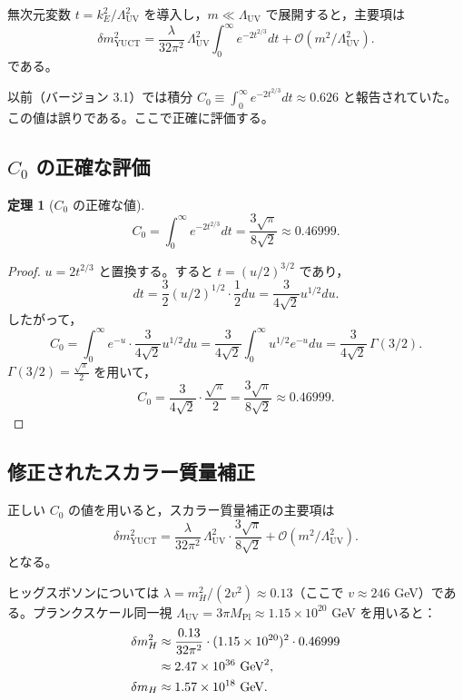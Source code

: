 \documentclass[11pt,a4paper]{article}
\newcommand{\Mpl}{M_{\mathrm{Pl}}}
\newcommand{\LUV}{\Lambda_{\mathrm{UV}}}
\newtheorem{theorem}{定理}[section]
\theoremstyle{remark}
\begin{document}
	無次元変数 \(t = k_E^2/\LUV^2\) を導入し，\(m \ll \LUV\) で展開すると，主要項は
	\begin{equation}
		\delta m^2_{\mathrm{YUCT}} = \frac{\lambda}{32\pi^2}\,\LUV^2 \int_0^{\infty} e^{-2t^{2/3}} dt + \mathcal{O}(m^2/\LUV^2).
		\label{eq:scalar_lead}
	\end{equation}
	である。
	
	以前（バージョン 3.1）では積分 \(C_0 \equiv \int_0^{\infty} e^{-2t^{2/3}} dt \approx 0.626\) と報告されていた。この値は誤りである。ここで正確に評価する。
	
	\subsection{\(C_0\) の正確な評価}
	
	\begin{theorem}[\(C_0\) の正確な値]
		\label{thm:C0}
		\[
		C_0 = \int_0^{\infty} e^{-2t^{2/3}} dt = \frac{3\sqrt{\pi}}{8\sqrt{2}} \approx 0.46999.
		\]
	\end{theorem}
	
	\begin{proof}
		\(u = 2t^{2/3}\) と置換する。すると \(t = (u/2)^{3/2}\) であり，
		\[
		dt = \frac{3}{2} (u/2)^{1/2} \cdot \frac{1}{2} du = \frac{3}{4\sqrt{2}} u^{1/2} du.
		\]
		したがって，
		\[
		C_0 = \int_0^{\infty} e^{-u} \cdot \frac{3}{4\sqrt{2}} u^{1/2} du = \frac{3}{4\sqrt{2}} \int_0^{\infty} u^{1/2} e^{-u} du = \frac{3}{4\sqrt{2}} \, \Gamma(3/2).
		\]
		\(\Gamma(3/2) = \frac{\sqrt{\pi}}{2}\) を用いて，
		\[
		C_0 = \frac{3}{4\sqrt{2}} \cdot \frac{\sqrt{\pi}}{2} = \frac{3\sqrt{\pi}}{8\sqrt{2}} \approx 0.46999.
		\]
	\end{proof}
	
	\subsection{修正されたスカラー質量補正}
	
	正しい \(C_0\) の値を用いると，スカラー質量補正の主要項は
	\begin{equation}
		\boxed{\delta m^2_{\mathrm{YUCT}} = \frac{\lambda}{32\pi^2}\,\LUV^2 \cdot \frac{3\sqrt{\pi}}{8\sqrt{2}} + \mathcal{O}(m^2/\LUV^2)}.
		\label{eq:scalar_corrected}
	\end{equation}
	となる。
	
	ヒッグスボソンについては \(\lambda = m_H^2/(2v^2) \approx 0.13\)（ここで \(v \approx 246\) GeV）である。プランクスケール同一視 \(\LUV = 3\pi\Mpl \approx 1.15\times 10^{20}\) GeV を用いると：
	\begin{align}
		\delta m^2_H &\approx \frac{0.13}{32\pi^2} \cdot (1.15\times 10^{20})^2 \cdot 0.46999 \notag\\
		&\approx 2.47 \times 10^{36}\ \mathrm{GeV}^2, \notag\\
		\delta m_H &\approx 1.57 \times 10^{18}\ \mathrm{GeV}.
		\label{eq:planck_correction}
	\end{align}
	
\end{document}
